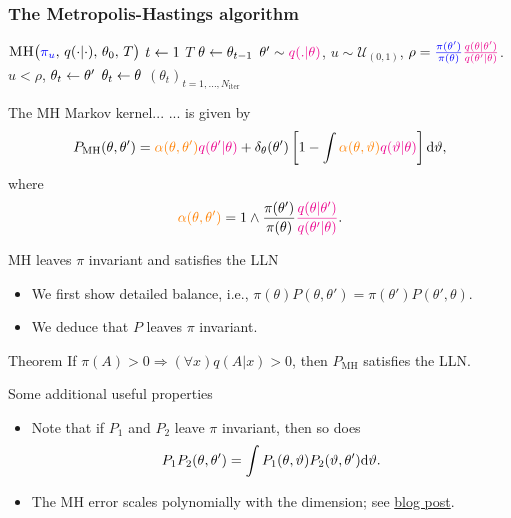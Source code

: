 \documentclass[10pt]{beamer}
\let\oldcitep=\citep
\renewcommand\citep[1]{\hyperlink{#1}{\textcolor{vert}{\oldcitep{#1}}}}
\renewcommand\un[1]{\textcolor{magenta}{#1}}
\renewcommand\unn[1]{\textcolor{blue}{#1}}
\newcommand\unnnn[1]{\textcolor{orange}{#1}}
\def\blank{\vspace{.5\textheight}}
\begin{document}
\begin{frame}
\frametitle{The Metropolis-Hastings algorithm}
\begin{algorithm}{$\Algo{MH}\big(\unn{\pi_u},\, q(\cdot\vert\cdot),\,\theta_{0},\, T\big)$}
\Aitem \For $t\leftarrow1$ \To $T$
\Aitem \mt $\theta\leftarrow\theta_{t-1}$
\Aitem \mt $\theta'\sim \un{q(.\vert\theta)}$, $u\sim\mathcal U_{(0,1)}$,
\Aitem \mt $\rho =  \unn{\frac{\pi(\theta')}{\pi(\theta)}} \un{\frac{q(\theta\vert\theta')}{q(\theta'\vert\theta)}}$.
\Aitem \mt \If $u<\rho$,
\Aitem \mtt $\theta_{t}\leftarrow\theta'$
\mt \algoremark{\unn{Accept}}
\Aitem \mt \Else $\theta_{t}\leftarrow\theta$
\mt \algoremark{\unn{Reject}} \label{ai:acceptanceEnd}
\Aitem
\Return $(\theta_{t})_{t=1,\dots,N_{\text{iter}}}$
\end{algorithm}
\end{frame}

\begin{frame}{The MH Markov kernel...}
... is given by
  $$
P_{\text{MH}}(\theta,\theta') = \unnnn{\alpha(\theta,\theta')} \un{q(\theta'\vert\theta)} + \delta_\theta(\theta')\left[1-\int \unnnn{\alpha(\theta,\vartheta)}\un{q(\vartheta\vert\theta)}\right]\d\vartheta,
$$
where
$$
\unnnn{\alpha(\theta,\theta')} = 1\wedge \frac{\pi(\theta')}{\pi(\theta)} \un{\frac{q(\theta\vert\theta')}{q(\theta'\vert\theta)}}.
$$
\blank
\end{frame}

\begin{frame}{MH leaves $\pi$ invariant and satisfies the LLN}
\begin{itemize}
  \item We first show detailed balance, i.e., $\pi(\theta)P(\theta,\theta') = \pi(\theta')P(\theta',\theta).$
  \vfill
  \vfill
  \vfill
  \vfill
  \item We deduce that $P$ leaves $\pi$ invariant.
  \vfill
  \vfill
  \vfill
  \vfill
\end{itemize}
\vfill
\begin{block}{Theorem \citep{RoCa04}}
  If $\pi(A)>0\Rightarrow (\forall x) q(A\vert x)>0$, then $P_{\text{MH}}$ satisfies the LLN.
\end{block}
\begin{exampleblock}{Some additional useful properties}
  \begin{itemize}
    \item Note that if $P_1$ and $P_2$ leave $\pi$ invariant, then so does
    $$
    P_1P_2 (\theta,\theta') = \int P_1(\theta,\vartheta)P_2(\vartheta,\theta'){\rm d}\vartheta.
    $$
    \item The MH error scales polynomially with the dimension; see \href{https://statisfaction.wordpress.com/2018/05/15/scaling-of-mcmc-with-dimension-experiments/}{blog post}.
  \end{itemize}
\end{exampleblock}
\end{frame}
\end{document}
